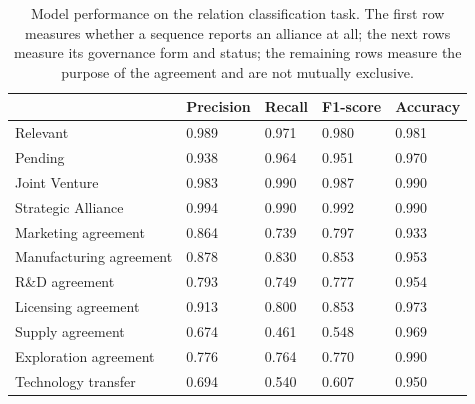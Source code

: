 \begin{table}[]
    \centering
    \begin{tabular}{lllll}
    \toprule
    {} & Precision &    Recall &  F1-score &  Accuracy \\
    \midrule
    Relevant                &  0.989 &  0.971 &  0.980 &  0.981 \\
    Pending                 &  0.938 &  0.964 &  0.951 &  0.970 \\
    Joint Venture           &  0.983 &  0.990 &  0.987 &  0.990 \\
    Strategic Alliance      &  0.994 &  0.990 &  0.992 &  0.990 \\
    Marketing agreement     &  0.864 &  0.739 &  0.797 &  0.933 \\
    Manufacturing agreement &  0.878 &  0.830 &  0.853 &  0.953 \\
    R\&D agreement           &  0.793 &  0.749 &  0.777 &  0.954 \\
    Licensing agreement     &    0.913 &   0.800 &  0.853 &  0.973 \\
    Supply agreement        &  0.674 &  0.461 &  0.548 &  0.969 \\
    Exploration agreement   &  0.776 &  0.764 &  0.770 &  0.990 \\
    Technology transfer     &  0.694 &  0.540 &  0.607 &  0.950 \\
    \bottomrule
    \end{tabular}
    \caption{Model performance on the relation classification task. The first row measures whether a sequence reports an alliance at all; the next rows measure its governance form and status; the remaining rows measure the purpose of the agreement and are not mutually exclusive.}
    \label{tab:performance}
\end{table}

